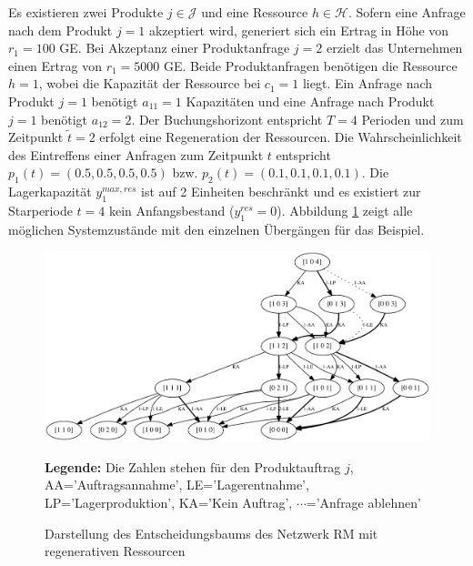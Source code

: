 Es existieren zwei Produkte $j\in\mathcal{J}$ und eine Ressource $h\in\mathcal{H}$. Sofern eine Anfrage nach dem Produkt $j=1$ akzeptiert wird, generiert sich ein Ertrag in Höhe von $r_1=100$ GE. Bei Akzeptanz einer Produktanfrage $j=2$ erzielt das Unternehmen einen Ertrag von $r_1=5000$ GE. Beide Produktanfragen benötigen die Ressource $h=1$, wobei die Kapazität der Ressource bei $c_1=1$ liegt. Ein Anfrage nach Produkt $j=1$ benötigt $a_{11}=1$ Kapazitäten und eine Anfrage nach Produkt $j=1$ benötigt $a_{12}=2$. Der Buchungshorizont entspricht $T=4$ Perioden und zum Zeitpunkt $\tilde{t}=2$ erfolgt eine Regeneration der Ressourcen. Die Wahrscheinlichkeit des Eintreffens einer Anfragen zum Zeitpunkt $t$ entspricht $ p_{1}(t)=(0.5, 0.5, 0.5, 0.5)$ bzw. $ p_{2}(t)=(0.1, 0.1, 0.1, 0.1)$. Die Lagerkapazität $y_1^{max,res}$ ist auf 2 Einheiten beschränkt und es existiert zur Starperiode $t=4$ kein Anfangsbestand ($y_1^{res}=0$). Abbildung \ref{B6} zeigt alle möglichen Systemzustände mit den einzelnen Übergängen für das Beispiel. 

\begin{figure}[h!]
  \begin{center}
    \includegraphics[width=140mm]{Bilder/Beispiel6.pdf}
    \caption{Darstellung des Entscheidungsbaums des Netzwerk RM mit regenerativen Ressourcen}  \label{B6}
    {\footnotesize \textbf{Legende:} Die Zahlen stehen für den Produktauftrag $j$, AA='Auftragsannahme', LE='Lagerentnahme', LP='Lagerproduktion', KA='Kein Auftrag', $\cdots$='Anfrage ablehnen'} 
  \end{center}
\end{figure}

